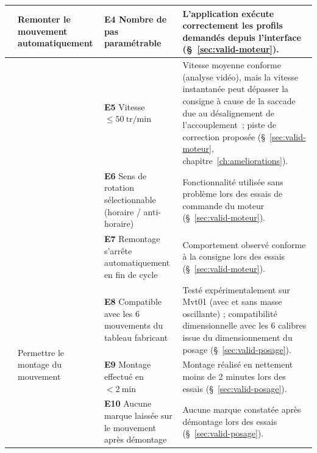\begin{landscape}
\begin{longtable}{|>{\raggedright\arraybackslash}p{1cm}|p{4cm}|p{8cm}|p{8cm}|}
\multirow{4}{*}{FS2} & \multirow{4}{4cm}{Remonter le mouvement automatiquement}
    & \cellcolor{resConforme}\rule[-0.4\baselineskip]{0pt}{1.8\baselineskip}\textbf{E4} Nombre de pas paramétrable
    & \rule[-0.4\baselineskip]{0pt}{1.8\baselineskip}L'application exécute correctement les profils demandés depuis l'interface (§~\ref{sec:valid-moteur}). \\
\cline{3-4}
 & & \cellcolor{resAFaire}\rule[-0.4\baselineskip]{0pt}{1.8\baselineskip}\textbf{E5} Vitesse $\leq 50\ \mathrm{tr/min}$
    & \rule[-0.4\baselineskip]{0pt}{1.8\baselineskip}Vitesse moyenne conforme (analyse vidéo), mais la vitesse instantanée peut dépasser la consigne à cause de la saccade due au désalignement de l'accouplement~; piste de correction proposée (§~\ref{sec:valid-moteur}, chapitre~\ref{ch:ameliorations}). \\
\cline{3-4}
 & & \cellcolor{resConforme}\rule[-0.4\baselineskip]{0pt}{1.8\baselineskip}\textbf{E6} Sens de rotation sélectionnable (horaire / anti-horaire)
    & \rule[-0.4\baselineskip]{0pt}{1.8\baselineskip}Fonctionnalité utilisée sans problème lors des essais de commande du moteur (§~\ref{sec:valid-moteur}). \\
\cline{3-4}
 & & \cellcolor{resConforme}\rule[-0.4\baselineskip]{0pt}{1.8\baselineskip}\textbf{E7} Remontage s'arrête automatiquement en fin de cycle
    & \rule[-0.4\baselineskip]{0pt}{1.8\baselineskip}Comportement observé conforme à la consigne lors des essais (§~\ref{sec:valid-moteur}). \\
\hline

\multirow{3}{*}{FS3} & \multirow{3}{4cm}{Permettre le montage du mouvement}
    & \cellcolor{resConforme}\rule[-0.4\baselineskip]{0pt}{1.8\baselineskip}\textbf{E8} Compatible avec les 6 mouvements du tableau fabricant
    & \rule[-0.4\baselineskip]{0pt}{1.8\baselineskip}Testé expérimentalement sur Mvt01 (avec et sans masse oscillante) ; compatibilité dimensionnelle avec les 6 calibres issue du dimensionnement du posage (§~\ref{sec:valid-posage}). \\
\cline{3-4}
 & & \cellcolor{resConforme}\rule[-0.4\baselineskip]{0pt}{1.8\baselineskip}\textbf{E9} Montage effectué en $< 2\ \mathrm{min}$
    & \rule[-0.4\baselineskip]{0pt}{1.8\baselineskip}Montage réalisé en nettement moins de 2 minutes lors des essais (§~\ref{sec:valid-posage}). \\
\cline{3-4}
 & & \cellcolor{resConforme}\rule[-0.4\baselineskip]{0pt}{1.8\baselineskip}\textbf{E10} Aucune marque laissée sur le mouvement après démontage
    & \rule[-0.4\baselineskip]{0pt}{1.8\baselineskip}Aucune marque constatée après démontage lors des essais (§~\ref{sec:valid-posage}). \\
\hline


\end{longtable}
\end{landscape}
